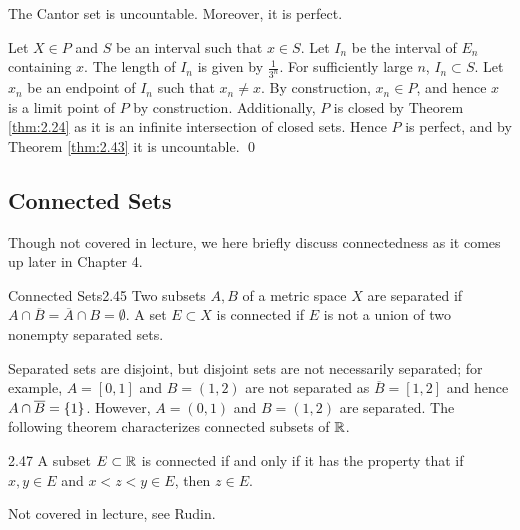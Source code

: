 \begin{ntheorem}{}{}
    The Cantor set is uncountable. Moreover, it is perfect.
\end{ntheorem}


\begin{nproof}
    Let $X \in P$ and $S$ be an interval such that $x \in S$. Let $I_n$ be the interval of $E_n$ containing $x$. The length of $I_n$ is given by $\frac{1}{3^n}$. For sufficiently large $n$, $I_n \subset S$. Let $x_n$ be an endpoint of $I_n$ such that $x_n \neq x$. By construction, $x_n \in P$, and hence $x$ is a limit point of $P$ by construction. Additionally, $P$ is closed by Theorem \ref{thm:2.24} as it is an infinite intersection of closed sets. Hence $P$ is perfect, and by Theorem \ref{thm:2.43} it is uncountable. \qed
\end{nproof}

\subsection{Connected Sets}
Though not covered in lecture, we here briefly discuss connectedness as it comes up later in Chapter 4.

\begin{definition}{Connected Sets}{2.45}
    Two subsets $A, B$ of a metric space $X$ are separated if $A \cap \overline{B} = \overline{A} \cap B = \emptyset$. A set $E \subset X$ is connected if $E$ is not a union of two nonempty separated sets.
\end{definition}
\noindent Separated sets are disjoint, but disjoint sets are not necessarily separated; for example, $A = [0, 1]$ and $B = (1, 2)$ are not separated as $\overline{B} = [1, 2]$ and hence $A \cap \overline{B} = \set{1}$. However, $A = (0, 1)$ and $B = (1, 2)$ are separated. The following theorem characterizes connected subsets of $\mathbb{R}$. 
\setcounter{rudin}{46}
\begin{theorem}{}{2.47}
    A subset $E \subset \mathbb{R}$ is connected if and only if it has the property that if $x, y \in E$ and $x < z < y \in E$, then $z \in E$.
\end{theorem}
\begin{nproof}
    Not covered in lecture, see Rudin.
\end{nproof}
